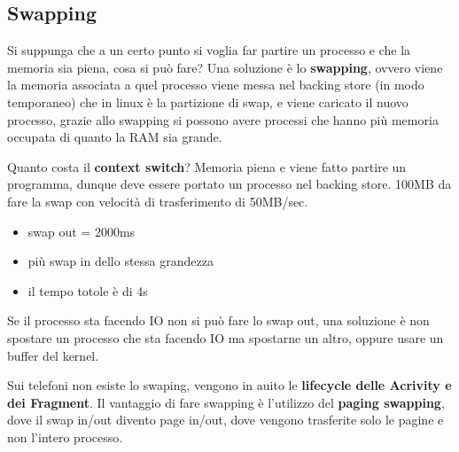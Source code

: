 \documentclass[12pt]{article}
\begin{document}
\subsection{Swapping}
Si suppunga che a un certo punto si voglia far partire un processo e che la memoria sia piena, cosa si pu\`o fare? Una soluzione \`e lo \textbf{swapping}, ovvero viene la memoria associata a quel processo viene messa nel backing store (in modo temporaneo) che in linux \`e la partizione di swap, e viene caricato il nuovo processo, grazie allo swapping si possono avere processi che hanno pi\`u memoria occupata di quanto la RAM sia grande.
\begin{example}{}{}
  Quanto costa il \textbf{context switch}? Memoria piena e viene fatto partire un programma, dunque deve essere portato un processo nel backing store. 100MB da fare la swap con velocit\`a di trasferimento di 50MB/sec.
  \begin{itemize}
    \item swap out = 2000ms
    \item pi\`u swap in dello stessa grandezza
    \item il tempo totole \`e di 4s
  \end{itemize}
  Se il processo sta facendo IO non si pu\`o fare lo swap out, una soluzione \`e non spostare un processo che sta facendo IO ma spostarne un altro, oppure usare un buffer del kernel.
\end{example}
Sui telefoni non esiste lo swaping, vengono in auito le \textbf{lifecycle delle Acrivity e dei Fragment}. Il vantaggio di fare swapping \`e l'utilizzo del \textbf{paging swapping}, dove il swap in/out divento page in/out, dove vengono trasferite solo le pagine e non l'intero processo.
\end{document}
